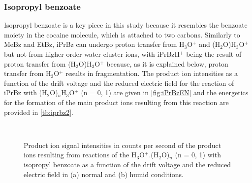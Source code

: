 \subsubsection{Isopropyl benzoate}
Isopropyl benzoate is a key piece in this study because it resembles the benzoate moiety in the cocaine molecule, which is attached to two carbons. 
%
Similarly to MeBz and EtBz, iPrBz can undergo proton transfer from H$_3$O$^+$ and (H$_2$O)H$_3$O$^+$ but not from higher order water cluster ions, with iPrBzH$^+$ being the result of  proton transfer from (H$_2$O)H$_3$O$^+$ because, as it is explained below, proton transfer from H$_3$O$^+$ results in fragmentation.
%
The product ion intensities as a function of the drift voltage and the reduced electric field for the reaction of iPrBz with (H$_2$O)$_n$H$_3$O$^+$ (n = 0, 1) are given in \autoref{fig:iPrBzEN} and the energetics for the formation of the main product ions resulting from this reaction are provided in \autoref{tb:iprbz2}.


\begin{figure}[htbp]
\centering
{}\\
\caption{Product ion signal intensities in counts per second of the product ions resulting from reactions of the H$_3$O$^+$.(H$_2$O)$_n$ (n = 0, 1) with isopropyl benzoate as a function of the drift voltage and the reduced electric field in (a) normal and (b) humid conditions.} 
\label{fig:iPrBzEN}
\end{figure}


